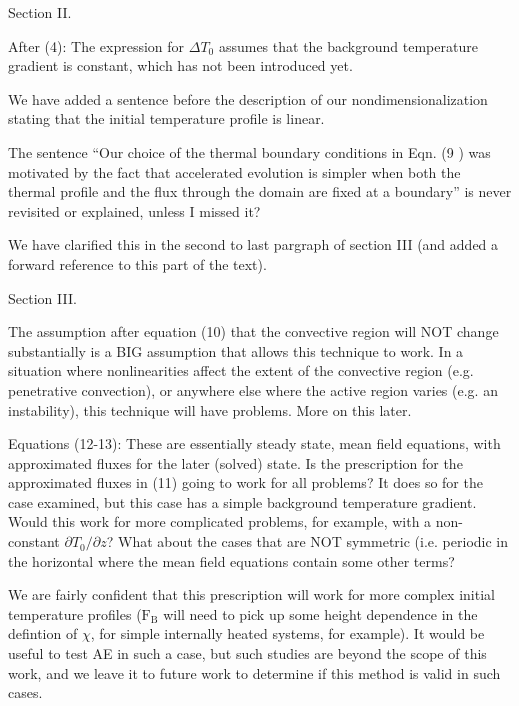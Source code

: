 \documentclass[aps, 11pt, singlecolumn]{revtex4-1} %
\begin{document}
\begin{singlespace}
\begin{myquotation}
Section II.

After (4): The expression for $\Delta T_0$ assumes that the background
temperature gradient is constant, which has not been introduced yet.
\end{myquotation}
We have added a sentence before the description of our nondimensionalization
stating that the initial temperature profile is linear.

\begin{myquotation}
The sentence ``Our choice of the thermal boundary conditions in Eqn.
(9 ) was motivated by the fact that accelerated evolution is simpler
when both the thermal profile and the flux through the domain are
fixed at a boundary'' is never revisited or explained, unless I missed
it?
\end{myquotation}
We have clarified this in the second to last pargraph of section III 
(and added a forward reference to this part of the text). 

\begin{myquotation}
Section III.

The assumption after equation (10) that the convective region will NOT
change substantially is a BIG assumption that allows this technique to
work. In a situation where nonlinearities affect the extent of the
convective region (e.g. penetrative convection), or anywhere else
where the active region varies (e.g. an instability), this technique
will have problems. More on this later.

Equations (12-13): These are essentially steady state, mean field
equations, with approximated fluxes for the later (solved) state. Is
the prescription for the approximated fluxes in (11) going to work for
all problems? It does so for the case examined, but this case has a
simple background temperature gradient. Would this work for more
complicated problems, for example, with a non-constant $\partial T_0/\partial z$? What
about the cases that are NOT symmetric (i.e. periodic in the
horizontal where the mean field equations contain some other terms?
\end{myquotation}
We are fairly confident that this prescription will work for more complex
initial temperature profiles ($\text{F}_{\text{B}}$ will need to pick up some
height dependence in the defintion of $\chi$, for simple internally heated
systems, for example). It would be useful to test AE in such a case, but such
studies are beyond the scope of this work, and we leave it to future work
to determine if this method is valid in such cases.   


\end{singlespace}
\end{document}
